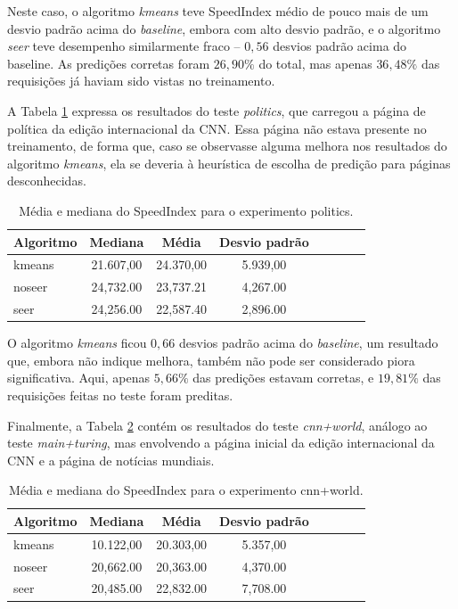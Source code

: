 \documentclass[10pt,twocolumn,letterpaper]{article}
\begin{document}
Neste caso, o algoritmo \emph{kmeans} teve SpeedIndex médio de pouco mais de um desvio padrão acima do \emph{baseline}, embora com alto desvio padrão, e o algoritmo \emph{seer} teve desempenho similarmente fraco -- $0,56$ desvios padrão acima do baseline. As predições corretas foram $26,90 \%$ do total, mas apenas $36,48 \%$ das requisições já haviam sido vistas no treinamento.

A Tabela \ref{tbl-cnn-politics} expressa os resultados do teste \emph{politics}, que carregou a página de política da edição internacional da CNN. Essa página não estava presente no treinamento, de forma que, caso se observasse alguma melhora nos resultados do algoritmo \emph{kmeans}, ela se deveria à heurística de escolha de predição para páginas desconhecidas.

\begin{table}
\begin{center}
\begin{tabular}{l*{6}{c}r}
\hline
Algoritmo & Mediana & Média & Desvio padrão \\
\hline
kmeans & 21.607,00 & 24.370,00 & 5.939,00 \\
noseer  & 24,732.00 & 23,737.21  & 4,267.00 \\
seer & 24,256.00 & 22,587.40 & 2,896.00 \\
\hline
\end{tabular}
\end{center}
\caption{Média e mediana do SpeedIndex para o experimento politics.}
\label{tbl-cnn-politics}
\end{table}

O algoritmo \emph{kmeans} ficou $0,66$ desvios padrão acima do \emph{baseline}, um resultado que, embora não indique melhora, também não pode ser considerado piora significativa. Aqui, apenas $5,66 \%$ das predições estavam corretas, e $19,81 \%$ das requisições feitas no teste foram preditas.

Finalmente, a Tabela \ref{tbl-cnn-main-world} contém os resultados do teste \emph{cnn+world}, análogo ao teste \emph{main+turing}, mas envolvendo a página inicial da edição internacional da CNN e a página de notícias mundiais.

\begin{table}
\begin{center}
\begin{tabular}{l*{6}{c}r}
\hline
Algoritmo & Mediana & Média & Desvio padrão \\
\hline
kmeans & 10.122,00 & 20.303,00 & 5.357,00 \\
noseer  & 20,662.00 & 20,363.00 & 4,370.00 \\
seer & 20,485.00 & 22,832.00 & 7,708.00 \\
\hline
\end{tabular}
\end{center}
\caption{Média e mediana do SpeedIndex para o experimento cnn+world.}
\label{tbl-cnn-main-world}
\end{table}
\end{document}
